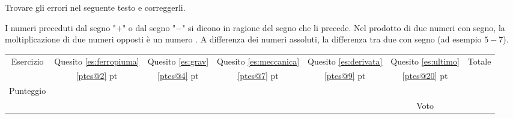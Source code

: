 \documentclass[a4paper, 10pt]{extarticle}
\begin{document}
\begin{esercizio}
Trovare gli errori nel seguente testo e correggerli.

\renewcommand{\baselinestretch}{2.0}
\sffamily
I numeri preceduti dal segno "$+$" o dal segno "$-$" si dicono  in ragione del segno che li precede.
Nel prodotto di due numeri con segno, la moltiplicazione di due numeri opposti è un numero .
A differenza dei numeri assoluti, la differenza tra due   con segno  (ad esempio $5 - 7$). 
\renewcommand{\baselinestretch}{1.0}
\end{esercizio}
\baselinestretch

\begin{esercizio}
\end{esercizio}

\begin{esercizio}[pt=3]\label{es:ultimo}
\end{esercizio}


\vfill
\begin{center}
\begin{tabular}{|c|c|c|c|c|c|c|}
\hline
Esercizio	&	Quesito \ref{es:ferropiuma}
		&	Quesito \ref{es:grav}
		&	Quesito \ref{es:meccanica}
		&	Quesito \ref{es:derivata}
		&	Quesito \ref{es:ultimo}
		&	Totale
		\\
 		&	\ref{ptes@2} pt
		&	\ref{ptes@4} pt
		&	\ref{ptes@7} pt
		&	\ref{ptes@9} pt
		&	\ref{ptes@20} pt
		&	
		\\
\hline
Punteggio	&&&&&&\\[1em]
\hline
\multicolumn{4}{c}{}&&Voto&\\[1em]
\cline{6-7}
\end{tabular}
\end{center}
\end{document}
